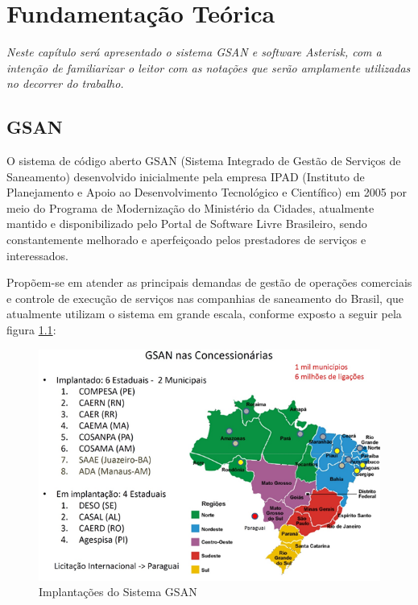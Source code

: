 \chapter[Fundamentação Teórica]{\textbf{F}undamentação \textbf{T}eórica}

\textit{Neste capítulo será apresentado o sistema GSAN e software Asterisk, com a intenção de familiarizar o leitor com as notações que serão amplamente utilizadas no decorrer do trabalho.}


\section{GSAN}
O sistema de código aberto GSAN\label{key:GSAN-TEORIA} (Sistema Integrado de Gestão de Serviços de Saneamento) desenvolvido inicialmente pela empresa IPAD (Instituto de Planejamento e Apoio ao Desenvolvimento Tecnológico e Científico) em 2005 por meio do Programa de Modernização do Ministério da Cidades, atualmente mantido e disponibilizado pelo Portal de Software Livre Brasileiro, sendo constantemente melhorado e aperfeiçoado pelos prestadores de serviços e interessados. 

Propõem-se em atender as principais demandas de gestão de operações comerciais e controle de execução de serviços nas companhias de saneamento do Brasil, que atualmente utilizam o sistema em grande escala, conforme exposto a seguir pela figura \ref{figura:implantacaoSistemaGSAN}:


\begin{figure}[H]
	\centering
	\caption{Implantações do Sistema GSAN}	
	\label{figura:implantacaoSistemaGSAN}
	\includegraphics{figuras/implantacaoGSAN.png}
\end{figure}


